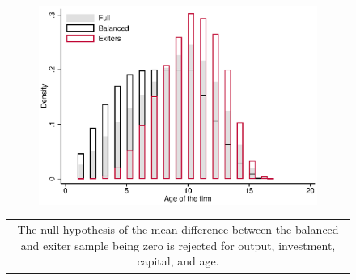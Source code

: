 \documentclass[11pt]{article}
\begin{document}
\begin{figure}[ht]
\begin{subfigure}[b]{.3\textwidth}
	\includegraphics[width=\textwidth]{histA.eps}
\end{subfigure}
\begin{tabular*}{1\textwidth}{c}
	\multicolumn{1}{p{1\hsize}}{\footnotesize The null hypothesis of the mean difference between the balanced and exiter sample being zero is rejected for output, investment, capital, and age.}\\
\end{tabular*}    
\end{figure}

\newpage
\end{document}
